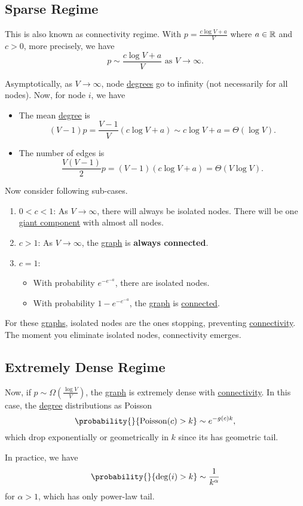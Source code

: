 \subsection{Sparse Regime}\label{subsec:sparse-regime}
This is also known as connectivity regime. With \(p = \frac{c\log V + a}{V}\) where \(a\in\mathbb{\MakeUppercase{R}}\) and \(c>0\),
more precisely, we have
\[
	p\sim \frac{c\log V + a}{V} \text{ as }V\to \infty.
\]

Asymptotically, as \(V\to \infty \), node \hyperref[def:degree]{degrees} go to infinity (not necessarily for all nodes). Now, for node \(i\), we have
\begin{itemize}
	\item The mean \hyperref[def:degree]{degree} is
	      \[
		      (V - 1)p = \frac{V-1}{V}(c\log V + a)\sim c\log V + a = \Theta(\log V).
	      \]
	\item The number of edges is
	      \[
		      \frac{V(V-1)}{2}p = (V - 1)(c\log V + a) = \Theta(V\log V).
	      \]
\end{itemize}

\begin{remark}
	Now consider following sub-cases.
	\begin{enumerate}
		\item \(0<c<1\): As \(V\to \infty \), there will always be isolated nodes. There will be one \hyperref[def:giant-component]{giant component} with almost all nodes.
		\item \(c>1\): As \(V\to \infty \), the \hyperref[def:graph]{graph} is \textbf{always connected}.
		\item \(c = 1\):
		      \begin{itemize}
			      \item With probability \(e^{-e^{-a}}\), there are isolated nodes.
			      \item With probability \(1 - e^{-e^{-a}}\), the \hyperref[def:graph]{graph} is \hyperref[def:connected]{connected}.
		      \end{itemize}
	\end{enumerate}
	For these \hyperref[def:graph]{graphs}, isolated nodes are the ones stopping, preventing \hyperref[def:connected]{connectivity}.
	The moment you eliminate isolated nodes, connectivity emerges.
\end{remark}

\subsection{Extremely Dense Regime}\label{subsec:extremely-dense-regime}
Now, if \(p\sim \Omega(\frac{\log V}{V})\), the \hyperref[def:graph]{graph} is extremely dense with \hyperref[def:connected]{connectivity}. In this case,
the \hyperref[def:degree]{degree} distributions as Poisson
\[
	\probability{}{\mathrm{Poisson}(c) > k} \sim e^{-g(c)k},
\]
which drop exponentially or geometrically in \(k\) since its has geometric tail.
\begin{remark}
	In practice, we have
	\[
		\probability{}{\deg(i) > k} \sim \frac{1}{k^\alpha }
	\]
	for \(\alpha > 1\), which has only power-law tail.
\end{remark}